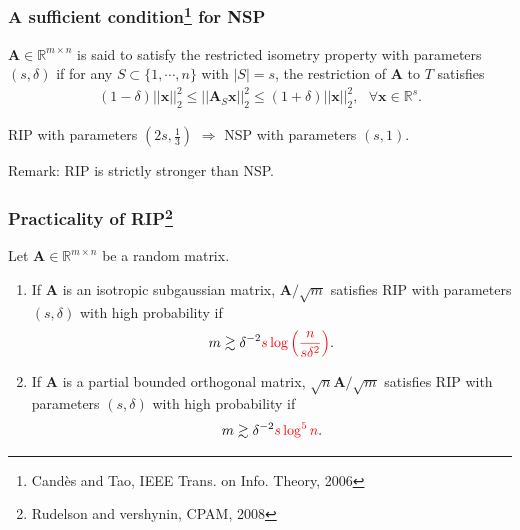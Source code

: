 \documentclass[11pt]{beamer}
\def\R{{\mathbb R}}
\def\R{{\mathbb R}}
\def\A{{\mathbf A}}
\def\x{{\mathbf x}}
\begin{document}
\begin{frame}
\frametitle{A sufficient condition\footnote{Cand\`es and Tao, IEEE Trans. on Info. Theory, 2006} for NSP}

\begin{definition}
$\A\in\R^{m\times n}$ is said to satisfy the restricted isometry property with parameters $(s, \delta)$ if for any $S\subset\{1, \cdots, n\}$ with $|S|= s$, the restriction of $\A$ to $T$ satisfies
\begin{align*}
(1-\delta)||\x||^2_2\leq ||\A_S\x||^2_2\leq (1+\delta)||\x||^2_2, \ \ \ \forall\x\in\R^s. 
\end{align*}
\end{definition}

\begin{theorem}
\begin{center}
RIP with parameters $(2s, \frac{1}{3})$ $\Rightarrow$ NSP with parameters $(s, 1)$. 
\end{center}
\end{theorem} 

\medskip

{\color{orange}Remark}: RIP is strictly stronger than NSP. 
\end{frame}

\begin{frame}
\frametitle{Practicality of RIP\footnote{Rudelson and vershynin, CPAM, 2008}}

\begin{Theorem}

Let $\A\in\R^{m\times n}$ be a random matrix. 
\begin{enumerate}

\item If $\A$ is an isotropic subgaussian matrix, $\A/\sqrt{m}$ satisfies RIP with parameters $(s, \delta)$ with high probability if $$m\gtrsim \delta^{-2}{\color{red}s\log\left(\frac{n}{s\delta^2}\right)}.$$

\medskip

\item If $\A$ is a partial bounded orthogonal matrix, $\sqrt{n}\A/\sqrt{m}$ satisfies RIP with parameters $(s, \delta)$ with high probability if $$m\gtrsim \delta^{-2}{\color{red}s\log^5 n}.$$  
\end{enumerate}
\end{Theorem} 
\end{frame}
\end{document}
